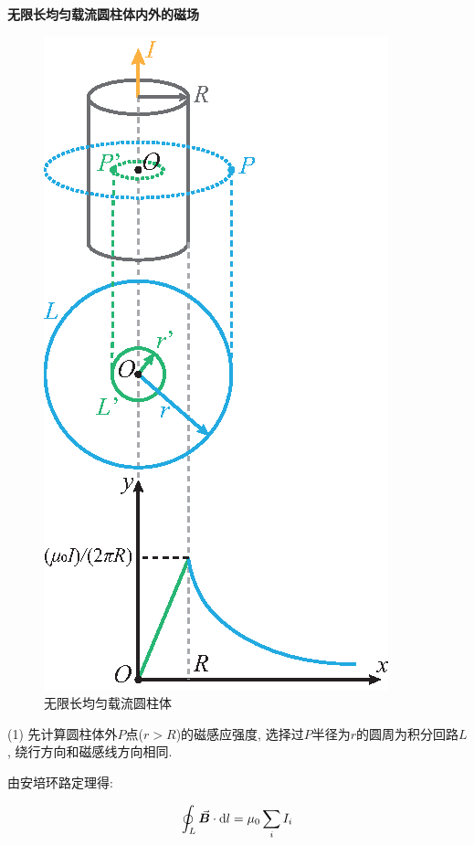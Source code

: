 \begin{example}
	\textbf{无限长均匀载流圆柱体内外的磁场}
	
	\begin{figure}[H]
		\centering
		\includegraphics[scale=1.0]{C8-fig8.eps}
		\caption{无限长均匀载流圆柱体}
	\end{figure}
	
	\begin{solution}
		
		(1) 先计算圆柱体外$P$点($r > R$)的磁感应强度, 选择过$P$半径为$r$的圆周为积分回路$L$, 绕行方向和磁感线方向相同. 
		
		由安培环路定理得: 
	    
	    \begin{equation*}
	    	\oint_{L} \va*{B} \cdot \dd{l} = \mu_0 \sum\limits_{i} I_i
	    \end{equation*}
	    

\end{solution}
\end{example}
